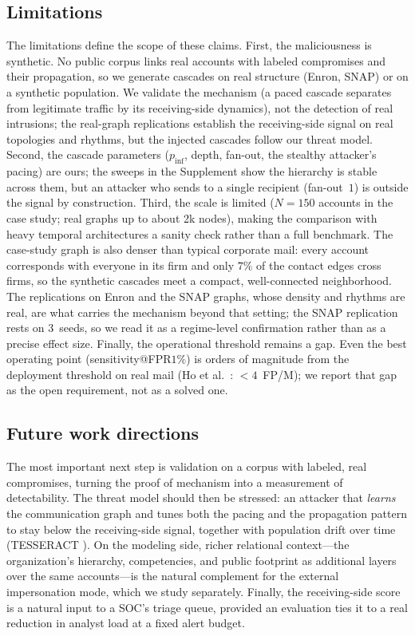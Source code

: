 \subsection{Limitations}
The limitations define the scope of these claims. First, the maliciousness is synthetic. No public corpus
links real accounts with labeled compromises and their propagation, so we generate cascades on real structure
(Enron, SNAP) or on a synthetic population. We validate the mechanism (a paced cascade separates from
legitimate traffic by its receiving-side dynamics), not the detection of real intrusions; the real-graph
replications establish the receiving-side signal on real topologies and rhythms, but the injected cascades
follow our threat model. Second, the cascade parameters ($p_\mathrm{inf}$, depth, fan-out, the stealthy
attacker's pacing) are ours; the sweeps in the Supplement show the hierarchy is stable across them, but an
attacker who sends to a single recipient (fan-out~$1$) is outside the signal by construction. Third, the scale is limited
($N{=}150$ accounts in the case study; real graphs up to about 2k nodes), making the comparison with heavy
temporal architectures a sanity check rather than a full benchmark. The case-study graph is also denser than
typical corporate mail: every account corresponds with everyone in its firm and only $7\%$ of the contact
edges cross firms, so the synthetic cascades meet a compact, well-connected neighborhood. The replications on
Enron and the SNAP graphs, whose density and rhythms are real, are what carries the mechanism beyond that
setting; the SNAP replication rests on $3$~seeds, so we read it as a regime-level confirmation rather than as
a precise effect size. Finally, the operational threshold remains
a gap. Even the best operating point (sensitivity@FPR$1\%$) is orders of magnitude from the deployment
threshold on real mail (Ho et al.\ \citep{ho2019detecting}: $<\!4$~FP/M); we report that gap as the open
requirement, not as a solved one.

\subsection{Future work directions}
The most important next step is validation on a corpus with labeled, real compromises, turning the proof of
mechanism into a measurement of detectability. The threat model should then be stressed: an attacker that
\emph{learns} the communication graph and tunes both the pacing and the propagation pattern to stay below the
receiving-side signal, together with population drift over time (TESSERACT \citep{pendlebury2019tesseract}).
On the modeling side, richer relational context---the organization's hierarchy, competencies, and public
footprint as additional layers over the same accounts---is the natural complement for the external
impersonation mode, which we study separately. Finally, the receiving-side score is a natural input to a
SOC's triage queue, provided an evaluation ties it to a real reduction in analyst load at a fixed alert
budget.
